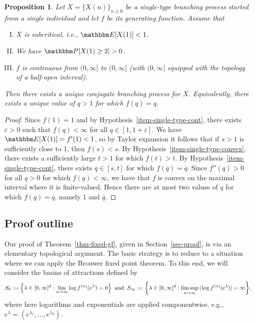 \documentclass[11pt]{article}
\theoremstyle{plain}
\newtheorem{prop}[thm]{Proposition}
\theoremstyle{definition}
\numberwithin{equation}{section}
\newcommand{\eqbn}{\begin{equation*}}
\newcommand{\eqen}{\end{equation*}}
\newcommand{\BB}{\mathbbm}
\newcommand{\ol}{\overline}
\newcommand{\ep}{\varepsilon}
\let\originalleft\left
\let\originalright\right
\renewcommand{\left}{\mathopen{}\mathclose\bgroup\originalleft}
\renewcommand{\right}{\aftergroup\egroup\originalright}
\begin{document}
\begin{prop} \label{prop-single-type}
Let $X= \{X(n)\}_{n \geq 0}$ be a single-type branching process started from a single individual and let $f$ be its generating function. Assume that 
\begin{enumerate}[I.]
\item $X$ is subcritical, i.e., $\BB E[X(1)] < 1$.  \label{item-single-type-sub}
\item We have $\BB P[X(1) \geq 2] > 0$.  \label{item-single-type-convex} 
\item $f$ is continuous from $(0,\infty]$ to $(0,\infty]$ (with $(0,\infty]$ equipped with the topology of a half-open interval). \label{item-single-type-cont}
\end{enumerate}
Then there exists a unique conjugate branching process for $X$. Equivalently, there exists a unique value of $ q > 1$ for which $f(  q) =  q$. 
\end{prop}
\begin{proof}
Since $f(1) = 1$ and by Hypothesis~\ref{item-single-type-cont}, there exists $\ep > 0$ such that $f(q) < \infty$ for all $q \in [1,1+\ep]$. 
We have $\BB E[X(1)] = f'(1) < 1$, so by Taylor expansion it follows that if $s > 1$ is sufficiently close to 1, then $f(s) < s$. By Hypothesis~\ref{item-single-type-convex}, there exists a sufficiently large $t > 1$ for which $f(t) > t$. By Hypothesis~\ref{item-single-type-cont}, there exists $  \ol q \in [s,t]$ for which $f( \ol q) =   \ol q$. Since $f''(q) > 0$ for all $q > 0$ for which $f(q) < \infty$, we have that $f$ is convex on the maximal interval where it is finite-valued. Hence there are at most two values of $q$ for which $f(q) = q$, namely $1$ and $ \ol q$. 
\end{proof} 



\subsection{Proof outline}
\label{sec-outline}

Our proof of Theorem~\ref{thm-fixed-gf}, given in Section~\ref{sec-proof}, is via an elementary topological argument. 
The basic strategy is to reduce to a situation where we can apply the Brouwer fixed point theorem. To this end, we will consider the basins of attractions defined by
\eqbn
S_0 := \left\{ \lambda \in [0,\infty]^d : \lim_{n\to\infty} \log f^{(n)}(e^\lambda) = 0 \right\} \;\; \text{and} \;\;
S_\infty := \left\{ \lambda \in [0,\infty]^d : \limsup_{n\to\infty} |\log f^{(n)}(e^\lambda)| = \infty \right\} ,
\eqen
where here logarithms and exponentials are applied componentwise, e.g., $e^\lambda = (e^{\lambda_1} ,\dots,e^{\lambda_d})$. 
\end{document}
